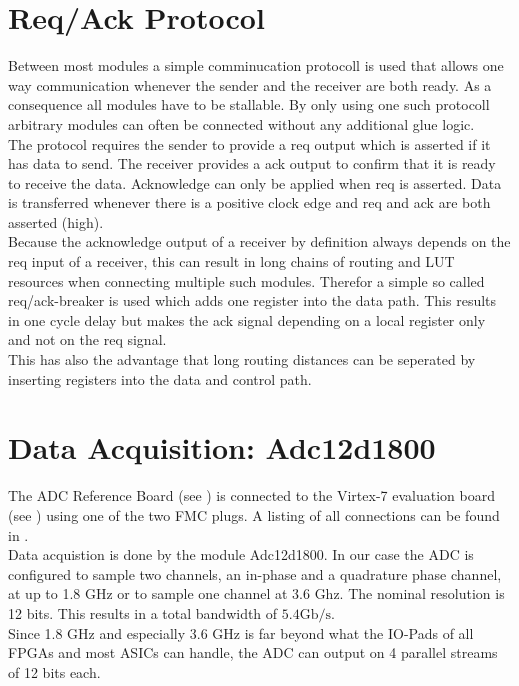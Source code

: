 \section{Req/Ack Protocol}
\label{sec:fpga_reqack}
Between most modules a simple comminucation protocoll is used that allows
one way communication whenever the sender and the receiver are both
ready. As a consequence all modules have to be stallable. By only using
one such protocoll arbitrary modules can often be connected
without any additional glue logic. \\

The protocol requires the sender to provide a \acrfull{req} output which
is asserted if it has data to send. The receiver provides a \acrfull{ack}
output to confirm that it is ready to receive the data.
Acknowledge can only be applied when \gls{req} is asserted.
Data is transferred whenever there is a positive clock edge and
\gls{req} and \gls{ack} are both asserted (high). \\

Because the acknowledge output of a receiver by definition always depends on the
\gls{req} input of a receiver, this can result in long chains of routing and
\gls{LUT} resources when connecting multiple such modules.
Therefor a simple so called \gls{req}/\gls{ack}-breaker is used which adds one
register into the data path. This results in one cycle delay but makes the
\gls{ack} signal depending on a local register only and not on the
\gls{req} signal. \\

This has also the advantage that long routing distances can be seperated by
inserting registers into the data and control path. \\

\section{Data Acquisition: Adc12d1800}
\label{sec:fpga_adc}

The \gls{ADC} Reference Board (see ) is connected
to the Virtex-7 evaluation board (see )
using one of the two \gls{FMC} plugs.
A listing of all connections can be found in . \\

Data acquistion is done by the module Adc12d1800. In our case the ADC is
configured to sample two channels, an in-phase and a quadrature phase channel,
at up to 1.8 GHz or to sample one channel at 3.6 Ghz.
The nominal resolution is 12 bits. This results in a total bandwidth of
$5.4 \text{Gb}/\text{s}$. \\
Since 1.8 GHz and especially 3.6 GHz is far beyond what the IO-Pads of all
\glspl{FPGA}  and most \glspl{ASIC} can handle,
the ADC can output on 4 parallel streams of 12 bits each. \\

